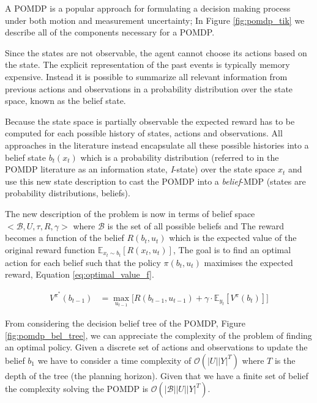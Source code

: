A POMDP is a popular approach for formulating a decision making process under both motion and measurement uncertainty;
In Figure \ref{fig:pomdp_tik} we describe all of the components necessary for a POMDP.

Since the states are not observable, the agent cannot choose its actions based on the state. The explicit 
representation of the past events is typically memory expensive. Instead it is possible to summarize all relevant 
information from previous actions and observations in a probability distribution over the state space, known as the
belief state. 

Because the state space is partially observable the expected reward has to be computed for each possible history of states, actions and observations.
All approaches in the literature instead encapsulate all these possible histories into a belief state $b_t(x_t)$ which is a 
probability distribution (referred to in the POMDP literature as an information state, \textit{I}-state) over the state space $x_t$ and use this 
new state description to cast the POMDP into a \textit{belief}-MDP (states are probability distributions, beliefs). 

The new description of the problem is now in terms of belief space $<\mathcal{B},U,\tau,R,\gamma>$ where $\mathcal{B}$ is the set of 
all possible beliefs and 
The reward becomes a function of the belief $R(b_t,u_t)$ which is the expected value of the original reward 
function $\mathbb{E}_{x_t \sim b_t}[R(x_t,u_t)]$, The goal is to find an optimal action for each belief such that 
the policy $\pi(b_t,u_t)$ maximises the expected reward, Equation \ref{eq:optimal_value_f}.

\begin{align}\label{eq:optimal_value_f}
 V^{\pi^*}(b_{t-1}) &= \max_{u_{t-1}} \bigg[ R(b_{t-1},u_{t-1}) + \gamma \cdot \mathbb{E}_{y_t}\left[ V^{\pi}(b_t)  \right] \bigg]
\end{align}

From considering the decision belief tree of the POMDP, Figure \ref{fig:pomdp_bel_tree}, we can appreciate the complexity of the problem
of finding an optimal policy. Given a discrete set of actions and observations to update the belief $b_1$ we have to consider a time 
complexity of $\mathcal{O}(|U||Y|^T)$ where $T$ is the depth of the tree (the planning horizon). Given that we have a finite set of 
belief the complexity solving the POMDP is $\mathcal{O}(|\mathcal{B}||U||Y|^T)$. 


